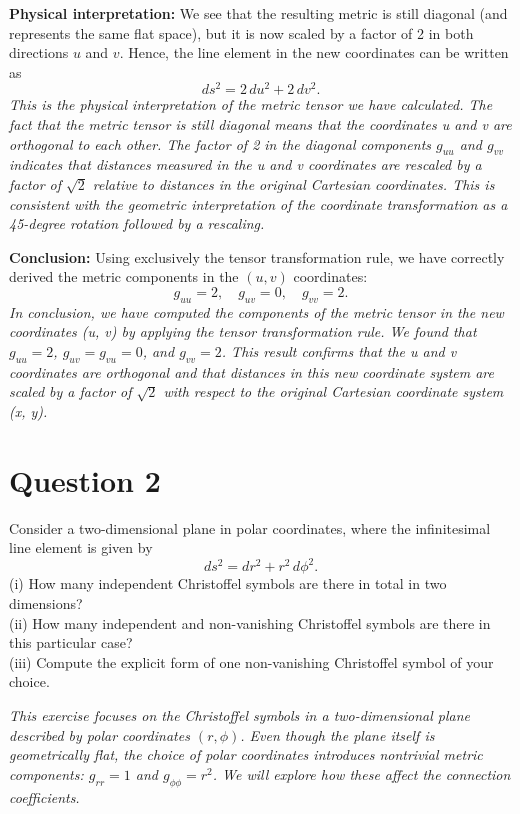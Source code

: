 \textbf{Physical interpretation:} We see that the resulting metric is still diagonal (and represents the same flat space), but it is now scaled by a factor of 2 in both directions \(u\) and \(v\). Hence, the line element in the new coordinates can be written as
\[
ds^2 = 2\,du^2 + 2\,dv^2.
\]
\emph{This is the physical interpretation of the metric tensor we have calculated. The fact that the metric tensor is still diagonal means that the coordinates u and v are orthogonal to each other. The factor of 2 in the diagonal components \(g_{uu}\) and \(g_{vv}\) indicates that distances measured in the u and v coordinates are rescaled by a factor of \(\sqrt{2}\) relative to distances in the original Cartesian coordinates. This is consistent with the geometric interpretation of the coordinate transformation as a 45-degree rotation followed by a rescaling.}

\textbf{Conclusion:}
Using exclusively the tensor transformation rule, we have correctly derived the metric components in the \((u, v)\) coordinates:
\[
g_{uu} = 2,
\quad
g_{uv} = 0,
\quad
g_{vv} = 2.
\]
\emph{In conclusion, we have computed the components of the metric tensor in the new coordinates (u, v) by applying the tensor transformation rule. We found that \(g_{uu} = 2\), \(g_{uv} = g_{vu} = 0\), and \(g_{vv} = 2\). This result confirms that the u and v coordinates are orthogonal and that distances in this new coordinate system are scaled by a factor of \(\sqrt{2}\) with respect to the original Cartesian coordinate system (x, y).}

\pagebreak

\section*{Question 2}

Consider a two-dimensional plane in polar coordinates, where the infinitesimal line element is given by
\[
ds^2 = dr^2 + r^2\,d\phi^2.
\]
(i) How many independent Christoffel symbols are there in total in two dimensions?\\
(ii) How many independent and non-vanishing Christoffel symbols are there in this particular case?\\
(iii) Compute the explicit form of one non-vanishing Christoffel symbol of your choice.

\emph{This exercise focuses on the Christoffel symbols in a two-dimensional plane described by polar coordinates \((r,\phi)\). Even though the plane itself is geometrically flat, the choice of polar coordinates introduces nontrivial metric components: \(g_{rr} = 1\) and \(g_{\phi\phi} = r^2\). We will explore how these affect the connection coefficients.}

